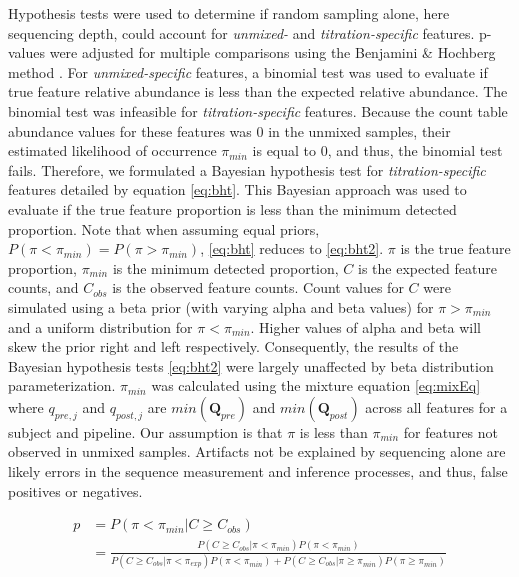 \documentclass{bmcart}
\begin{document}
Hypothesis tests were used to determine if random sampling alone, here sequencing depth, could account for \emph{unmixed-} and \emph{titration-specific} features.
p-values were adjusted for multiple comparisons using the Benjamini \& Hochberg method \cite{benjamini1995controlling}.
For \emph{unmixed-specific} features, a binomial test was used to evaluate if true feature relative abundance is less than the expected relative abundance.
The binomial test was infeasible for \emph{titration-specific} features.
Because the count table abundance values for these features was 0 in the unmixed samples,
their estimated likelihood of occurrence $\pi_{min}$ is equal to 0,
and thus, the binomial test fails.
Therefore, we formulated a Bayesian hypothesis test for \emph{titration-specific} features detailed by equation \eqref{eq:bht}.
This Bayesian approach was used to  evaluate if the true feature proportion is less than the minimum detected proportion.
Note that when assuming equal priors, $P(\pi < \pi_{min}) = P(\pi > \pi_{min})$,
\eqref{eq:bht} reduces to \eqref{eq:bht2}.
$\pi$ is the true feature proportion, $\pi_{min}$ is the minimum detected proportion,
$C$ is the expected feature counts, and $C_{obs}$ is the observed feature counts.
Count values for $C$ were simulated using a beta prior (with varying alpha and beta values) for $\pi > \pi_{min}$ and a uniform distribution for $\pi < \pi_{min}$.
Higher values of alpha and beta will skew the prior right and left respectively. Consequently, the results of the Bayesian hypothesis tests \eqref{eq:bht2} were largely unaffected by beta distribution parameterization.
$\pi_{min}$ was calculated using the mixture equation \eqref{eq:mixEq} where $q_{pre,j}$ and $q_{post,j}$ are $min(\textbf{Q}_{pre})$ and $min(\textbf{Q}_{post})$ across all features for a subject and pipeline.
Our assumption is that $\pi$ is less than $\pi_{min}$ for features not observed in unmixed samples.
Artifacts not be explained by sequencing alone are likely errors in the sequence measurement and inference processes, and thus, false positives or negatives.


\begin{equation}
  \begin{split}
    p & = P(\pi < \pi_{min} | C \geq C_{obs}) \\
      & = \frac{P(C \geq C_{obs}| \pi < \pi_{min})P(\pi < \pi_{min})}{P(C \geq C_{obs}| \pi < \pi_{exp})P(\pi < \pi_{min}) + P(C \geq C_{obs}| \pi \geq \pi_{min})P(\pi \geq \pi_{min})} \\
  \end{split}
  \label{eq:bht}
\end{equation}
\end{document}
